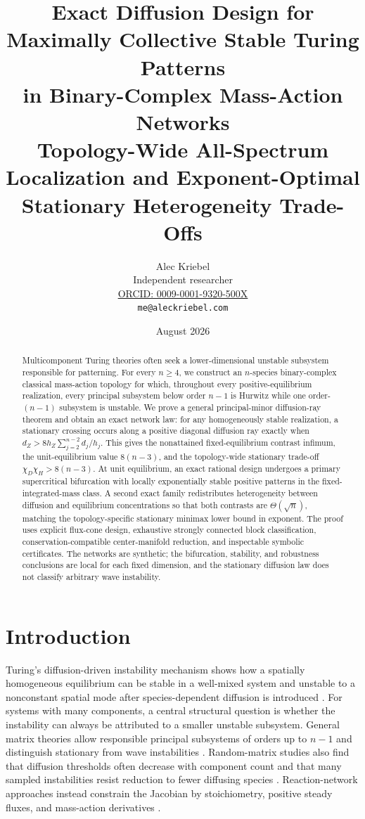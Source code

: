 \documentclass[11pt]{article}
\title{Exact Diffusion Design for Maximally Collective Stable Turing Patterns\\
\large in Binary-Complex Mass-Action Networks\\[0.25em]
\normalsize Topology-Wide All-Spectrum Localization and Exponent-Optimal Stationary Heterogeneity Trade-Offs}
\author{Alec Kriebel\\\small Independent researcher\\
\small \href{https://orcid.org/0009-0001-9320-500X}{ORCID: 0009-0001-9320-500X}\\
\small \texttt{me@aleckriebel.com}}
\date{August 2026}
\theoremstyle{definition}
\newcommand{\1}{\mathbf 1}
\begin{document}
\maketitle

\begin{abstract}
Multicomponent Turing theories often seek a lower-dimensional unstable
subsystem responsible for patterning.  For every $n\ge4$, we construct an
$n$-species binary-complex classical mass-action topology for which, throughout
every positive-equilibrium realization, every principal subsystem below order
$n-1$ is Hurwitz while one order-$(n-1)$ subsystem is unstable.  We prove a
general principal-minor diffusion-ray theorem and obtain an exact network law:
for any homogeneously stable realization, a stationary crossing occurs along a
positive diagonal diffusion ray exactly when
$d_Z>8h_Z\sum_{j=2}^{n-2}d_j/h_j$.  This gives the nonattained fixed-equilibrium
contrast infimum, the unit-equilibrium value $8(n-3)$, and the topology-wide
stationary trade-off $\chi_D\chi_H>8(n-3)$.  At unit equilibrium, an exact rational design
undergoes a primary supercritical bifurcation with locally exponentially
stable positive patterns in the fixed-integrated-mass class.  A second exact
family redistributes heterogeneity
between diffusion and equilibrium concentrations so that both contrasts are
$\Theta(\sqrt n)$, matching the topology-specific stationary minimax lower
bound in exponent.
The proof uses explicit flux-cone design, exhaustive strongly connected block
classification, conservation-compatible center-manifold reduction, and
inspectable symbolic certificates.  The networks are synthetic; the
bifurcation, stability, and robustness conclusions are local for each fixed
dimension, and the stationary diffusion law does not classify arbitrary wave
instability.
\end{abstract}

\section{Introduction}

Turing's diffusion-driven instability mechanism shows how a spatially
homogeneous equilibrium can be stable in a well-mixed system and unstable to a
nonconstant spatial mode after species-dependent diffusion is introduced
\cite{Turing1952}.  For systems with many components, a central structural
question is whether the instability can always be attributed to a smaller
unstable subsystem.  General matrix theories allow responsible principal
subsystems of orders up to $n-1$ and distinguish stationary from wave
instabilities \cite{Satnoianu2000,Anma2012,VillarChampneys2023,VillarCorrection2023}.
Random-matrix studies also find that diffusion thresholds often decrease with
component count and that many sampled instabilities resist reduction to fewer
diffusing species \cite{HaasGoldstein2021}.
Reaction-network approaches instead constrain the Jacobian by stoichiometry,
positive steady fluxes, and mass-action derivatives
\cite{MinchevaCraciun2013,Diego2018,Scholes2019,VassenaStadler2024}.
\end{document}
